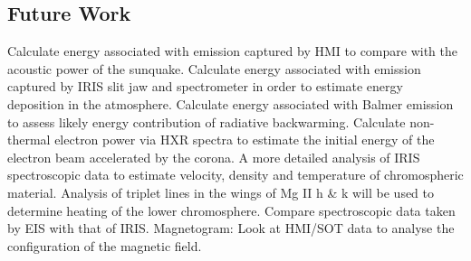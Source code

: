 \subsection{Future Work}
Calculate energy associated with emission captured by HMI to compare with the acoustic power of the sunquake. Calculate energy associated with emission captured by IRIS slit jaw and spectrometer in order to estimate energy deposition in the atmosphere. Calculate energy associated with Balmer emission to assess likely energy contribution of radiative backwarming. Calculate non-thermal electron power via HXR spectra to estimate the initial energy of the electron beam accelerated by the corona. A more detailed analysis of IRIS spectroscopic data to estimate velocity, density and temperature of chromospheric material. Analysis of triplet lines in the wings of Mg II h \& k will be used to determine heating of the lower chromosphere. Compare spectroscopic data taken by EIS with that of IRIS. Magnetogram: Look at HMI/SOT data to analyse the configuration of the magnetic field.\\
